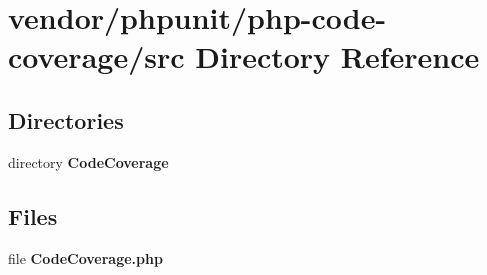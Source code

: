\section{vendor/phpunit/php-\/code-\/coverage/src Directory Reference}
\label{dir_fcd7946fef39c1d11a5fbe44dba02014}
\subsection*{Directories}
\begin{DoxyCompactItemize}
\item 
directory {\bf Code\+Coverage}
\end{DoxyCompactItemize}
\subsection*{Files}
\begin{DoxyCompactItemize}
\item 
file {\bf Code\+Coverage.\+php}
\end{DoxyCompactItemize}
